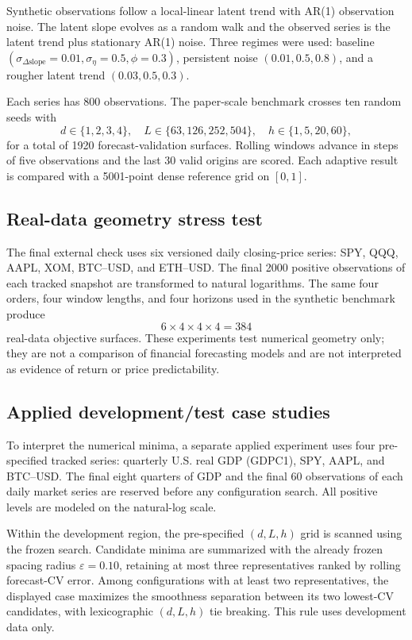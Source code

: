 \documentclass[english]{smcca}
\begin{document}
Synthetic observations follow a local-linear latent trend with AR(1) observation noise. The latent slope evolves as a random walk and the observed series is the latent trend plus stationary AR(1) noise. Three regimes were used: baseline \((\sigma_{\Delta\text{slope}}=0.01,\sigma_\eta=0.5,\phi=0.3)\), persistent noise \((0.01,0.5,0.8)\), and a rougher latent trend \((0.03,0.5,0.3)\).

Each series has 800 observations. The paper-scale benchmark crosses ten random seeds with
\[
d\in\{1,2,3,4\},\quad
L\in\{63,126,252,504\},\quad
h\in\{1,5,20,60\},
\]
for a total of 1920 forecast-validation surfaces. Rolling windows advance in steps of five observations and the last 30 valid origins are scored. Each adaptive result is compared with a 5001-point dense reference grid on \([0,1]\).

\subsection{Real-data geometry stress test}

The final external check uses six versioned daily closing-price series: SPY, QQQ, AAPL, XOM, BTC--USD, and ETH--USD. The final 2000 positive observations of each tracked snapshot are transformed to natural logarithms. The same four orders, four window lengths, and four horizons used in the synthetic benchmark produce
\[
6\times4\times4\times4=384
\]
real-data objective surfaces. These experiments test numerical geometry only; they are not a comparison of financial forecasting models and are not interpreted as evidence of return or price predictability.

\subsection{Applied development/test case studies}

To interpret the numerical minima, a separate applied experiment uses four
pre-specified tracked series: quarterly U.S. real GDP (GDPC1), SPY, AAPL, and
BTC--USD. The final eight quarters of GDP and the final 60 observations of each
daily market series are reserved before any configuration search. All positive
levels are modeled on the natural-log scale.

Within the development region, the pre-specified \((d,L,h)\) grid is scanned
using the frozen search. Candidate minima are summarized with the already
frozen spacing radius \(\varepsilon=0.10\), retaining at most three
representatives ranked by rolling forecast-CV error. Among configurations with
at least two representatives, the displayed case maximizes the smoothness
separation between its two lowest-CV candidates, with lexicographic
\((d,L,h)\) tie breaking. This rule uses development data only.
\end{document}
